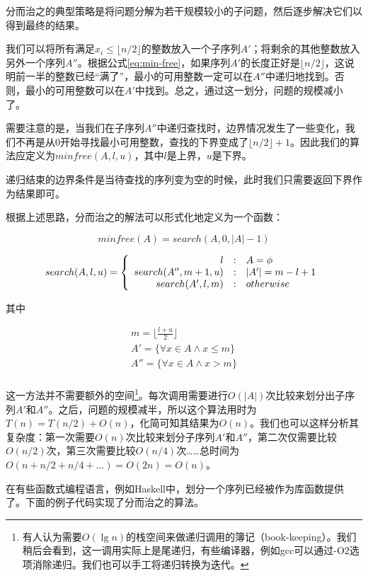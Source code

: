 \documentclass[UTF8]{article}
\begin{document}
分而治之的典型策略是将问题分解为若干规模较小的子问题，然后逐步解决它们以得到最终的结果。

我们可以将所有满足$x_i \leq \lfloor n/2 \rfloor$的整数放入一个子序列$A'$；将剩余的其他整数放入另外一个序列$A''$。根据公式\ref{eq:min-free}，如果序列$A'$的长度正好是$\lfloor n/2 \rfloor$，这说明前一半的整数已经“满了”，最小的可用整数一定可以在$A''$中递归地找到。否则，最小的可用整数可以在$A'$中找到。总之，通过这一划分，问题的规模减小了。

需要注意的是，当我们在子序列$A''$中递归查找时，边界情况发生了一些变化，我们不再是从0开始寻找最小可用整数，查找的下界变成了$\lfloor n/2 \rfloor + 1$。因此我们的算法应定义为$minfree(A, l, u)$，其中$l$是上界，$u$是下界。

递归结束的边界条件是当待查找的序列变为空的时候，此时我们只需要返回下界作为结果即可。

根据上述思路，分而治之的解法可以形式化地定义为一个函数：

\[
minfree(A) = search(A, 0, |A|-1)
\]

\[
search(A, l, u) = \left \{
       \begin{array}
       {r@{\quad:\quad}l}
       l & A = \phi \\
       search(A'', m+1, u) &  |A'| = m - l + 1 \\
       search(A',  l, m) & otherwise
       \end{array}
\right.
\]

其中

\[ \begin{array}{l}
m = \displaystyle \lfloor \frac{l+u}{2} \rfloor \\
A'  = \{ \forall x \in A \wedge x \leq m \} \\
A'' = \{ \forall x \in A \wedge x > m \} \\
\end{array} \]

这一方法并不需要额外的空间\footnote{有人认为需要$O(\lg n)$的栈空间来做递归调用的簿记（book-keeping）。我们稍后会看到，这一调用实际上是尾递归，有些编译器，例如gcc可以通过-O2选项消除递归。我们也可以手工将递归转换为迭代。}。每次调用需要进行$O(|A|)$次比较来划分出子序列$A'$和$A''$。之后，问题的规模减半，所以这个算法用时为$T(n) = T(n/2) + O(n)$，化简可知其结果为$O(n)$。我们也可以这样分析其复杂度：第一次需要$O(n)$次比较来划分子序列$A'$和$A''$，第二次仅需要比较$O(n/2)$次，第三次需要比较$O(n/4)$次……总时间为$O(n + n/2 + n/4 + ...) = O(2n) = O(n)$。

在有些函数式编程语言，例如Haskell中，划分一个序列已经被作为库函数提供了。下面的例子代码实现了分而治之的算法。
\end{document}
